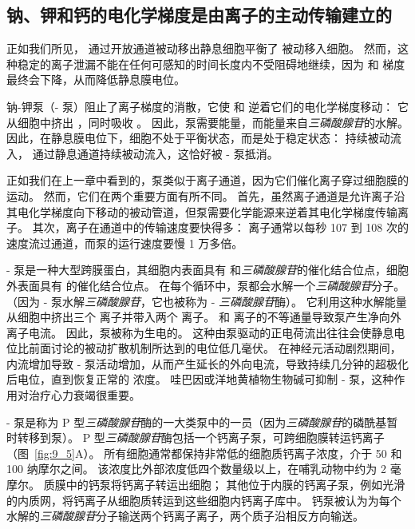 \subsection{钠、钾和钙的电化学梯度是由离子的主动传输建立的}

正如我们所见， 通过开放通道被动移出静息细胞平衡了  被动移入细胞。
然而，这种稳定的离子泄漏不能在任何可感知的时间长度内不受阻碍地继续，因为  和  梯度最终会下降，从而降低静息膜电位。


钠-钾泵（- 泵）阻止了离子梯度的消散，它使  和  逆着它们的电化学梯度移动：
它从细胞中挤出 ，同时吸收 。
因此，泵需要能量，而能量来自\textit{三磷酸腺苷}的水解。
因此，在静息膜电位下，细胞不处于平衡状态，而是处于稳定状态： 持续被动流入， 通过静息通道持续被动流入，这恰好被 - 泵抵消。


正如我们在上一章中看到的，泵类似于离子通道，因为它们催化离子穿过细胞膜的运动。
然而，它们在两个重要方面有所不同。
首先，虽然离子通道是允许离子沿其电化学梯度向下移动的被动管道，但泵需要化学能源来逆着其电化学梯度传输离子。
其次，离子在通道中的传输速度要快得多：
离子通常以每秒 107 到 108 次的速度流过通道，而泵的运行速度要慢 1 万多倍。


- 泵是一种大型跨膜蛋白，其细胞内表面具有  和\textit{三磷酸腺苷}的催化结合位点，细胞外表面具有  的催化结合位点。
在每个循环中，泵都会水解一个\textit{三磷酸腺苷}分子。
（因为 - 泵水解\textit{三磷酸腺苷}，它也被称为 - \textit{三磷酸腺苷}酶）。
它利用这种水解能量从细胞中挤出三个  离子并带入两个  离子。
 和  离子的不等通量导致泵产生净向外离子电流。
因此，泵被称为生电的。
这种由泵驱动的正电荷流出往往会使静息电位比前面讨论的被动扩散机制所达到的电位低几毫伏。
在神经元活动剧烈期间， 内流增加导致 - 泵活动增加，从而产生延长的外向电流，导致持续几分钟的超极化后电位，直到恢复正常的  浓度。
哇巴因或洋地黄植物生物碱可抑制 - 泵，这种作用对治疗心力衰竭很重要。


- 泵是称为 P 型\textit{三磷酸腺苷}酶的一大类泵中的一员（因为\textit{三磷酸腺苷}的磷酰基暂时转移到泵）。
P 型\textit{三磷酸腺苷}酶包括一个钙离子泵，可跨细胞膜转运钙离子（图~\ref{fig:9_5}A）。
所有细胞通常都保持非常低的细胞质钙离子浓度，介于 50 和 100 纳摩尔之间。
该浓度比外部浓度低四个数量级以上，在哺乳动物中约为 2 毫摩尔。
质膜中的钙泵将钙离子转运出细胞；
其他位于内膜的钙离子泵，例如光滑的内质网，将钙离子从细胞质转运到这些细胞内钙离子库中。
钙泵被认为为每个水解的\textit{三磷酸腺苷}分子输送两个钙离子离子，两个质子沿相反方向输送。



